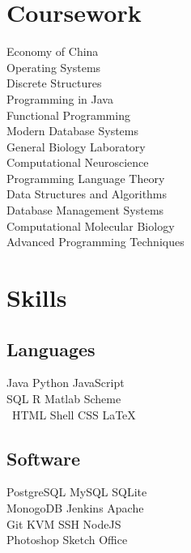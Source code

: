 \documentclass[]{deedy-resume-openfont}
\begin{document}
\begin{minipage}[t]{0.33\textwidth}

\section{Coursework}
Economy of China\\
Operating Systems\\
Discrete Structures\\
Programming in Java\\
Functional Programming\\
Modern Database Systems\\
General Biology Laboratory\\
Computational Neuroscience\\
Programming Language Theory\\
Data Structures and Algorithms\\
Database Management Systems\\
Computational Molecular Biology\\
Advanced Programming Techniques
\sectionsep


\section{Skills}
\subsection{Languages}
Java \textbullet{}  
Python \textbullet{}
JavaScript \\
SQL \textbullet{}
R \textbullet{}
Matlab \textbullet{}
Scheme \\\
HTML \textbullet{}
Shell \textbullet{} 
CSS \textbullet{}
\LaTeX\ \\ 

\subsection{Software}
PostgreSQL \textbullet{}
MySQL \textbullet{} 
SQLite \\
MonogoDB \textbullet{}
Jenkins \textbullet{}
Apache \\
Git \textbullet{}
KVM \textbullet{}
SSH \textbullet{}
NodeJS \\
Photoshop \textbullet{}
Sketch \textbullet{}
Office \\


\end{minipage}
\end{document}
